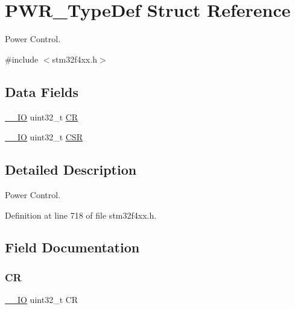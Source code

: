 \hypertarget{struct_p_w_r___type_def}{}\section{P\+W\+R\+\_\+\+Type\+Def Struct Reference}
\label{struct_p_w_r___type_def}


Power Control.  




{\ttfamily \#include $<$stm32f4xx.\+h$>$}

\subsection*{Data Fields}
\begin{DoxyCompactItemize}
\item 
\hyperlink{group___c_m_s_i_s__core__definitions_gaec43007d9998a0a0e01faede4133d6be}{\+\_\+\+\_\+\+IO} uint32\+\_\+t \hyperlink{struct_p_w_r___type_def_ab40c89c59391aaa9d9a8ec011dd0907a}{CR}
\item 
\hyperlink{group___c_m_s_i_s__core__definitions_gaec43007d9998a0a0e01faede4133d6be}{\+\_\+\+\_\+\+IO} uint32\+\_\+t \hyperlink{struct_p_w_r___type_def_a876dd0a8546697065f406b7543e27af2}{C\+SR}
\end{DoxyCompactItemize}


\subsection{Detailed Description}
Power Control. 

Definition at line 718 of file stm32f4xx.\+h.



\subsection{Field Documentation}
\mbox{\label{struct_p_w_r___type_def_ab40c89c59391aaa9d9a8ec011dd0907a}} 
\subsubsection{\texorpdfstring{CR}{CR}}
{\footnotesize\ttfamily \hyperlink{group___c_m_s_i_s__core__definitions_gaec43007d9998a0a0e01faede4133d6be}{\+\_\+\+\_\+\+IO} uint32\+\_\+t CR}

